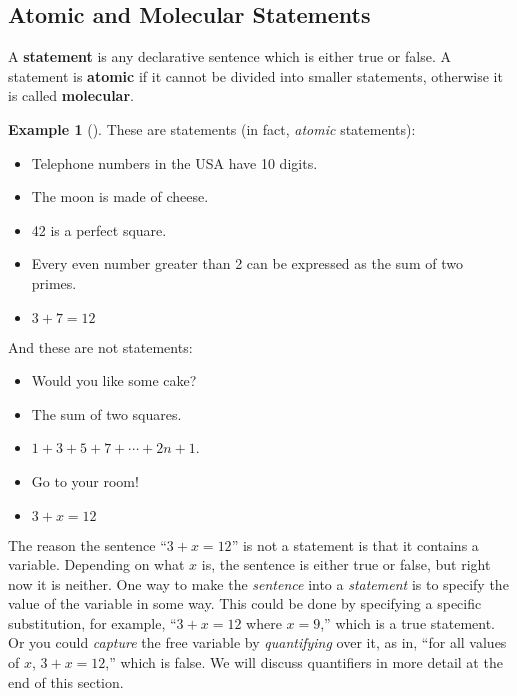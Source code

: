 \documentclass[10pt,]{book}
\newcommand{\terminology}[1]{\textbf{#1}}
\theoremstyle{plain}
\theoremstyle{definition}
\newtheorem{example}[theorem]{Example}
\theoremstyle{definition}
\numberwithin{equation}{chapter}
\begin{document}
\subsection[{Atomic and Molecular Statements}]{Atomic and Molecular Statements}\label{atomic-molecular-statements}
\hypertarget{p-42}{}%
A \terminology{statement} is any declarative sentence which is either true or false. A statement is \terminology{atomic} if it cannot be divided into smaller statements, otherwise it is called \terminology{molecular}.%
\begin{example}[]\label{example-1}
\hypertarget{p-43}{}%
These are statements (in fact, \emph{atomic} statements): \leavevmode%
\begin{itemize}[label=\textbullet]
\item{}\hypertarget{p-44}{}%
Telephone numbers in the USA have 10 digits.%
\item{}\hypertarget{p-45}{}%
The moon is made of cheese.%
\item{}\hypertarget{p-46}{}%
42 is a perfect square.%
\item{}\hypertarget{p-47}{}%
Every even number greater than 2 can be expressed as the sum of two primes.%
\item{}\hypertarget{p-48}{}%
\(3+7 = 12\)%
\end{itemize}
 And these are not statements: \leavevmode%
\begin{itemize}[label=\textbullet]
\item{}\hypertarget{p-49}{}%
Would you like some cake?%
\item{}\hypertarget{p-50}{}%
The sum of two squares.%
\item{}\(1+3+5+7+\cdots+2n+1\).%
\item{}\hypertarget{p-51}{}%
Go to your room!%
\item{}\hypertarget{p-52}{}%
\(3+x = 12\)%
\end{itemize}
%
\end{example}
\hypertarget{p-53}{}%
The reason the sentence ``\(3 + x = 12\)'' is not a statement is that it contains a variable. Depending on what \(x\) is, the sentence is either true or false, but right now it is neither. One way to make the \emph{sentence} into a \emph{statement} is to specify the value of the variable in some way. This could be done by specifying a specific substitution, for example, ``\(3+x = 12\) where \(x = 9\),'' which is a true statement.  Or you could \emph{capture} the free variable by \emph{quantifying} over it, as in, ``for all values of \(x\), \(3+x = 12\),'' which is false. We will discuss quantifiers in more detail at the end of this section.%
\end{document}
